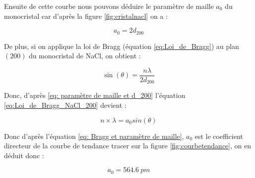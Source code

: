 \begin{flushleft}
	Ensuite de cette courbe nous pouvons déduire le paramètre de maille $a_0$ du monocristal car d'après la figure \ref{fig:cristalnacl} on a :
	
	\begin{equation}\label{eq: paramètre de maille et d_200}
		a_0=2d_{200}
	\end{equation}

	
De plus, si on applique la loi de Bragg (équation \ref{eq:Loi_de_Bragg}) au plan $(200)$ du monocristal de NaCl, on obtient : 

\begin{equation} \label{eq:Loi_de_Bragg_NaCl_200}
	\sin (\theta ) = \frac{n \lambda }{2 d_{200}}
\end{equation}
	
	
Donc, d'après \ref{eq: paramètre de maille et d_200} l'équation \ref{eq:Loi_de_Bragg_NaCl_200} devient :
	
	\begin{equation}\label{eq: Bragg et paramètre de maille}
		n \times \lambda = a_0sin(\theta)
	\end{equation}
	
	
	Donc d'après l'équation \ref{eq: Bragg et paramètre de maille}, $a_0$ est le coefficient directeur de la courbe  de tendance tracer sur la figure \ref{fig:courbetendance}, on en déduit donc :
	
	\begin{equation}
		\boxed{a_0 = 564.6 \ pm}
	\end{equation}
	

\end{flushleft}
\newpage

